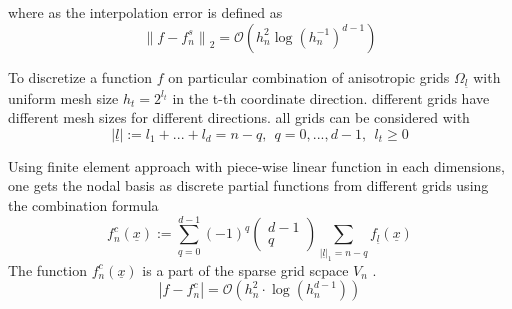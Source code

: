 where as the interpolation error is defined as 
\begin{equation}
	{\parallel f - f_{n}^s \parallel}_{2} = \mathcal{O}\left(h_n^2\log{}(h_{n}^{-1})^{d-1} \right)
\end{equation}


To discretize a function $f$ on particular combination of anisotropic grids $\Omega_{\underline{l}}$ with uniform mesh size $h_{t} = 2^{l_{t}}$ in the t-th coordinate direction.  different grids have different mesh sizes for different directions. 
all grids can be considered with
\begin{equation}
	|\underline{l}| := l_1 + ... + l_d = n-q, \ \ q = 0,...,d - 1, \ \ l_t \ge 0
\end{equation}

Using finite element approach with piece-wise linear function in each dimensions, one gets the nodal basis as discrete partial functions from different grids using the combination formula
\begin{equation}
	f_n^c(\underline{x}) := \sum_{q=0}^{d-1}(-1)^q \left( \begin{array}{c}
	d-1 \\
	q  \end{array} \right) \sum_{|\underline{l}|_1=n-q} f_{\underline{l}}(\underline{x})
\end{equation}
The function $f_n^c(\underline{x})$ is a part of the sparse grid scpace $V_{n}$ .
\begin{equation}
	|f-f_n^c| = \mathcal{O}\left(h_n^2 \cdot \log(h_{n}^{d-1}) \right)
\end{equation}

